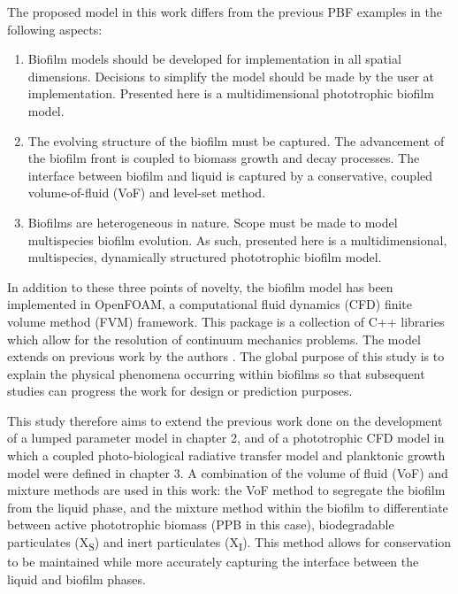 The proposed model in this work differs from the previous PBF examples in the following aspects:

\begin{enumerate}
\item Biofilm models should be developed for implementation in all spatial dimensions. Decisions to simplify the model should be made by the user at implementation. Presented here is a multidimensional phototrophic biofilm model.
\item The evolving structure of the biofilm must be captured. The advancement of the biofilm front is coupled to biomass growth and decay processes. The interface between biofilm and liquid is captured by a conservative, coupled volume-of-fluid (VoF) and level-set method.
\item Biofilms are heterogeneous in nature. Scope must be made to model multispecies biofilm evolution. As such, presented here is a multidimensional,  multispecies, dynamically structured phototrophic biofilm model.
\end{enumerate}

In addition to these three points of novelty, the biofilm model has been implemented in OpenFOAM, a computational fluid dynamics (CFD) finite volume method (FVM) framework. This package is a collection of C++ libraries which allow for the resolution of continuum mechanics problems. The model extends on previous work by the authors \cite{puyol2017}. The global purpose of this study is to explain the physical phenomena occurring within biofilms so that subsequent studies can progress the work for design or prediction purposes.

This study therefore aims to extend the previous work done on the development of a lumped parameter model in chapter 2, and of a phototrophic CFD model in which a coupled photo-biological radiative transfer model and planktonic growth model were defined in chapter 3. A combination of the volume of fluid (VoF) and mixture methods are used in this work: the VoF method to segregate the biofilm from the liquid phase, and the mixture method within the biofilm to differentiate between active phototrophic biomass (PPB  in this case), biodegradable particulates (X\textsubscript{S}) and inert particulates (X\textsubscript{I}). This method allows for conservation to be maintained while more accurately capturing the interface between the liquid and biofilm phases. 


